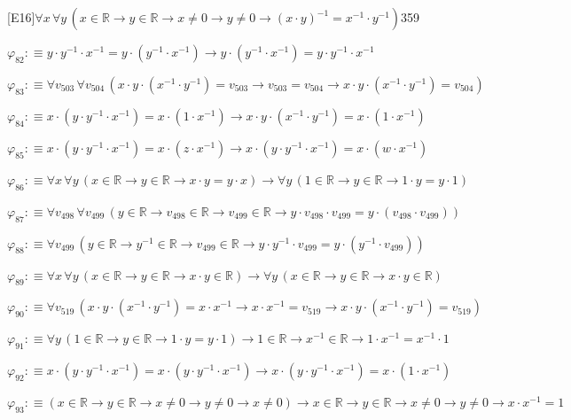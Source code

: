 \begin{fullproof}{[E16]}{$\forall x\,\forall y\,(x \in \mathbb{R} \to y \in \mathbb{R} \to x \neq 0 \to y \neq 0 \to (x \cdot y)^{-1} = x^{-1} \cdot y^{-1})$}{359}
\begin{abbrevlist}
\item $\varphi_{82} :\equiv y \cdot y^{-1} \cdot x^{-1} = y \cdot (y^{-1} \cdot x^{-1}) \to y \cdot (y^{-1} \cdot x^{-1}) = y \cdot y^{-1} \cdot x^{-1}$
\item $\varphi_{83} :\equiv \forall v_{503}\,\forall v_{504}\,(x \cdot y \cdot (x^{-1} \cdot y^{-1}) = v_{503} \to v_{503} = v_{504} \to x \cdot y \cdot (x^{-1} \cdot y^{-1}) = v_{504})$
\item $\varphi_{84} :\equiv x \cdot (y \cdot y^{-1} \cdot x^{-1}) = x \cdot (1 \cdot x^{-1}) \to x \cdot y \cdot (x^{-1} \cdot y^{-1}) = x \cdot (1 \cdot x^{-1})$
\item $\varphi_{85} :\equiv x \cdot (y \cdot y^{-1} \cdot x^{-1}) = x \cdot (z \cdot x^{-1}) \to x \cdot (y \cdot y^{-1} \cdot x^{-1}) = x \cdot (w \cdot x^{-1})$
\item $\varphi_{86} :\equiv \forall x\,\forall y\,(x \in \mathbb{R} \to y \in \mathbb{R} \to x \cdot y = y \cdot x) \to \forall y\,(1 \in \mathbb{R} \to y \in \mathbb{R} \to 1 \cdot y = y \cdot 1)$
\item $\varphi_{87} :\equiv \forall v_{498}\,\forall v_{499}\,(y \in \mathbb{R} \to v_{498} \in \mathbb{R} \to v_{499} \in \mathbb{R} \to y \cdot v_{498} \cdot v_{499} = y \cdot (v_{498} \cdot v_{499}))$
\item $\varphi_{88} :\equiv \forall v_{499}\,(y \in \mathbb{R} \to y^{-1} \in \mathbb{R} \to v_{499} \in \mathbb{R} \to y \cdot y^{-1} \cdot v_{499} = y \cdot (y^{-1} \cdot v_{499}))$
\item $\varphi_{89} :\equiv \forall x\,\forall y\,(x \in \mathbb{R} \to y \in \mathbb{R} \to x \cdot y \in \mathbb{R}) \to \forall y\,(x \in \mathbb{R} \to y \in \mathbb{R} \to x \cdot y \in \mathbb{R})$
\item $\varphi_{90} :\equiv \forall v_{519}\,(x \cdot y \cdot (x^{-1} \cdot y^{-1}) = x \cdot x^{-1} \to x \cdot x^{-1} = v_{519} \to x \cdot y \cdot (x^{-1} \cdot y^{-1}) = v_{519})$
\item $\varphi_{91} :\equiv \forall y\,(1 \in \mathbb{R} \to y \in \mathbb{R} \to 1 \cdot y = y \cdot 1) \to 1 \in \mathbb{R} \to x^{-1} \in \mathbb{R} \to 1 \cdot x^{-1} = x^{-1} \cdot 1$
\item $\varphi_{92} :\equiv x \cdot (y \cdot y^{-1} \cdot x^{-1}) = x \cdot (y \cdot y^{-1} \cdot x^{-1}) \to x \cdot (y \cdot y^{-1} \cdot x^{-1}) = x \cdot (1 \cdot x^{-1})$
\item $\varphi_{93} :\equiv (x \in \mathbb{R} \to y \in \mathbb{R} \to x \neq 0 \to y \neq 0 \to x \neq 0) \to x \in \mathbb{R} \to y \in \mathbb{R} \to x \neq 0 \to y \neq 0 \to x \cdot x^{-1} = 1$

\end{abbrevlist}
\end{fullproof}
